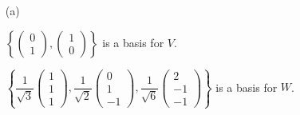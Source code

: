 \begin{Exercise}
	\begin{enumerate}[(a)]
		\item[(a)]
		\begin{answer}
			$\left\{ \begin{pmatrix}
			0 \\
			1
			\end{pmatrix}, \begin{pmatrix}
			1 \\
			0
			\end{pmatrix} \right\}$ is a basis for $V$.
			
			$\left\{ \dfrac{1}{\sqrt{3}}\begin{pmatrix}
			1 \\
			1 \\
			1
			\end{pmatrix}, \dfrac{1}{\sqrt{2}}\begin{pmatrix}
			0 \\
			1 \\
			-1
			\end{pmatrix}, \dfrac{1}{\sqrt{6}}\begin{pmatrix}
			2 \\
			-1 \\
			-1
			\end{pmatrix} \right\}$ is a basis for $W$.
			

\end{answer}
\end{enumerate}
\end{Exercise}
